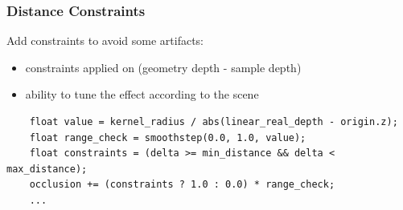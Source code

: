 \documentclass{beamer}
\begin{document}
\begin{frame}[fragile]
\frametitle{Distance Constraints}
Add constraints to avoid some artifacts:
\begin{itemize}
    \item constraints applied on  (geometry depth - sample depth)
    \item ability to tune the effect according to the scene
\end{itemize}

\begin{verbatim}
    float value = kernel_radius / abs(linear_real_depth - origin.z);
    float range_check = smoothstep(0.0, 1.0, value);
    float constraints = (delta >= min_distance && delta < max_distance);
    occlusion += (constraints ? 1.0 : 0.0) * range_check;
    ...
\end{verbatim}
\end{frame}
\end{document}
